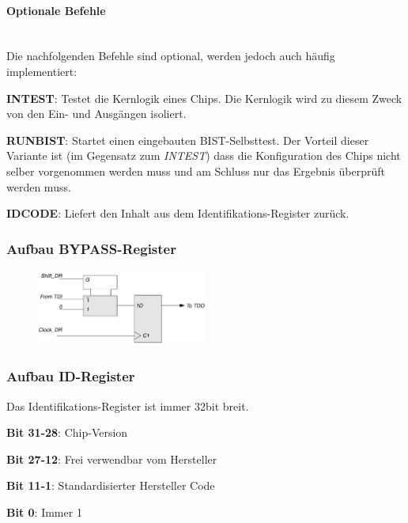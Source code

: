 \paragraph{Optionale Befehle}$~$ \\
Die nachfolgenden Befehle sind optional, werden jedoch auch häufig implementiert:
\begin{compactitem}
    \item \textbf{INTEST}: Testet die Kernlogik eines Chips. Die Kernlogik wird zu diesem Zweck von den Ein- und Ausgängen isoliert.
    \item \textbf{RUNBIST}: Startet einen eingebauten BIST-Selbsttest. Der Vorteil dieser Variante ist (im Gegensatz zum \textit{INTEST}) dass die Konfiguration des Chips nicht selber vorgenommen werden muss und am Schluss nur das Ergebnis überprüft werden muss.
    \item \textbf{IDCODE}: Liefert den Inhalt aus dem Identifikations-Register zurück.
\end{compactitem}
\begin{multicols}{2}
\subsubsection{Aufbau BYPASS-Register}
\begin{figure}[H]
    \includegraphics[width=0.5\textwidth]{images/bst_bypassregister.png}
\end{figure}

\subsubsection{Aufbau ID-Register}
Das Identifikations-Register ist immer 32bit breit.
\begin{compactitem}
    \item \textbf{Bit 31-28}: Chip-Version
    \item \textbf{Bit 27-12}: Frei verwendbar vom Hersteller
    \item \textbf{Bit 11-1}: Standardisierter Hersteller Code
    \item \textbf{Bit 0}: Immer 1
\end{compactitem}
\end{multicols}
